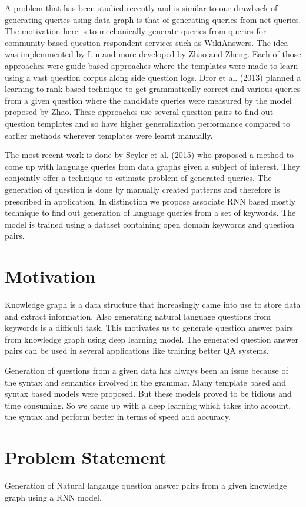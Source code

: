 \documentclass[conference]{IEEEtran}
\begin{document}
A problem that has been studied recently and is similar to our drawback of generating queries using data graph is that of generating queries from net queries. The motivation here is to mechanically generate queries from queries for community-based question respondent services such as WikiAnswers. The idea was implemmented by Lin and more developed by Zhao and Zheng. Each of those approaches were guide based approaches where the templates were made to learn using a vast question corpus along side question logs. Dror et al. (2013) planned a learning to rank based technique to get grammatically correct and various queries from a given question where the candidate queries were measured by the model proposed by Zhao. These approaches use several question pairs to find out question templates and so have higher generalization performance compared to earlier methods wherever templates were learnt manually.

The most recent work is done by Seyler et al. (2015) who proposed a method to come up with language queries
from data graphs given a subject of interest. They conjointly offer a technique to estimate problem
of generated queries. The generation of question is done by manually created patterns and therefore is prescribed in application. In distinction we propose associate RNN based mostly technique to find out
generation of language queries from a set of keywords. The model is trained using a dataset containing open domain keywords and question pairs.

\section{Motivation}
Knowledge graph is a data structure that increasingly came into use to store data and extract information. Also generating natural language questions from keywords is a difficult task. This motivates us to generate question answer pairs from knowledge graph using deep learning model. The generated question answer pairs can be used in several applications like training better QA systems.

Generation of questions from a given data has always been an issue because of the syntax and semantics involved in the  grammar. Many template based and syntax based models were proposed. But these models proved to be tidious and time consuming. So we came up with a deep learning which takes into account, the syntax and perform better in terms of speed and accuracy.
\section{Problem Statement}
Generation of Natural langauge question answer pairs from a given knowledge graph using a RNN model.
\end{document}
